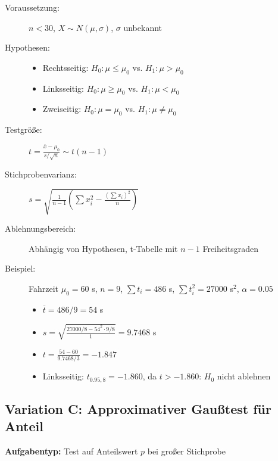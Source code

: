 \documentclass[12pt, a4paper, titlepage, ngerman]{scrartcl}
\begin{document}
\begin{description}
  \item[Voraussetzung:] $n < 30$, $X \sim N(\mu, \sigma)$, $\sigma$ unbekannt
  \item[Hypothesen:] 
    \begin{itemize}
      \item Rechtsseitig: $H_0: \mu \leq \mu_0$ vs. $H_1: \mu > \mu_0$
      \item Linksseitig: $H_0: \mu \geq \mu_0$ vs. $H_1: \mu < \mu_0$
      \item Zweiseitig: $H_0: \mu = \mu_0$ vs. $H_1: \mu \neq \mu_0$
    \end{itemize}
  \item[Testgröße:] $t = \frac{\overline{x} - \mu_0}{s/\sqrt{n}} \sim t(n-1)$
  \item[Stichprobenvarianz:] $s = \sqrt{\frac{1}{n-1}\left(\sum x_i^2 - \frac{(\sum x_i)^2}{n}\right)}$
  \item[Ablehnungsbereich:] Abhängig von Hypothesen, t-Tabelle mit $n-1$ Freiheitsgraden
  \item[Beispiel:] Fahrzeit $\mu_0 = 60$ s, $n=9$, $\sum t_i = 486$ s, $\sum t_i^2 = 27000$ s$^2$, $\alpha = 0.05$
    \begin{itemize}
      \item $\overline{t} = 486/9 = 54$ s
      \item $s = \sqrt{\frac{27000/8 - 54^2 \cdot 9/8}{1}} = 9.7468$ s
      \item $t = \frac{54 - 60}{9.7468/3} = -1.847$
      \item Linksseitig: $t_{0.95, 8} = -1.860$, da $t > -1.860$: $H_0$ nicht ablehnen
    \end{itemize}
\end{description}

\subsection{Variation C: Approximativer Gaußtest für Anteil}

\textbf{Aufgabentyp:} Test auf Anteilswert $p$ bei großer Stichprobe
\end{document}
